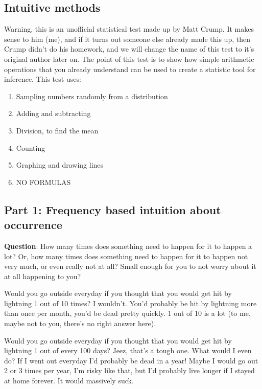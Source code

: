 \documentclass[
  letterpaper,
  DIV=11,
  numbers=noendperiod]{scrreprt}
\providecommand{\tightlist}{%
  \setlength{\itemsep}{0pt}\setlength{\parskip}{0pt}}
\begin{document}
\subsection{Intuitive methods}\label{intuitive-methods}

Warning, this is an unofficial statistical test made up by Matt Crump.
It makes sense to him (me), and if it turns out someone else already
made this up, then Crump didn't do his homework, and we will change the
name of this test to it's original author later on. The point of this
test is to show how simple arithmetic operations that you already
understand can be used to create a statistic tool for inference. This
test uses:

\begin{enumerate}
\def\labelenumi{\arabic{enumi}.}
\tightlist
\item
  Sampling numbers randomly from a distribution
\item
  Adding and subtracting
\item
  Division, to find the mean
\item
  Counting
\item
  Graphing and drawing lines
\item
  NO FORMULAS
\end{enumerate}

\subsection{Part 1: Frequency based intuition about
occurrence}\label{part-1-frequency-based-intuition-about-occurrence}

\textbf{Question}: How many times does something need to happen for it
to happen a lot? Or, how many times does something need to happen for it
to happen not very much, or even really not at all? Small enough for you
to not worry about it at all happening to you?

Would you go outside everyday if you thought that you would get hit by
lightning 1 out of 10 times? I wouldn't. You'd probably be hit by
lightning more than once per month, you'd be dead pretty quickly. 1 out
of 10 is a lot (to me, maybe not to you, there's no right answer here).

Would you go outside everyday if you thought that you would get hit by
lightning 1 out of every 100 days? Jeez, that's a tough one. What would
I even do? If I went out everyday I'd probably be dead in a year! Maybe
I would go out 2 or 3 times per year, I'm risky like that, but I'd
probably live longer if I stayed at home forever. It would massively
suck.
\end{document}
